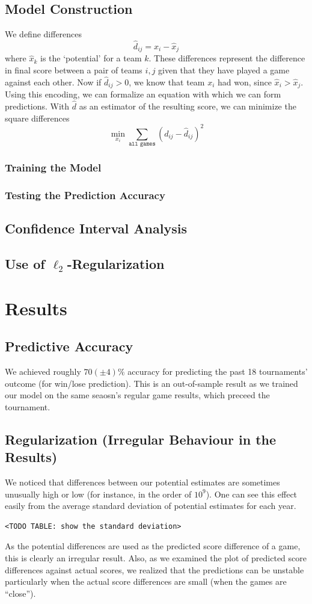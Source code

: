 \documentclass{article} %
\begin{document}
\subsection{Model Construction}
We define differences 
\[
\hat{d}_{ij} = \hat{x}_i - \hat{x}_j
\]
where $\hat{x}_k$ is the `potential' for a team $k$. These differences represent the difference in final score between a pair of teams $i,j$ given that they have played a game against each other. Now if $\hat{d}_{ij} > 0$, we know that team $x_i$ had won, since $\hat{x}_i > \hat{x}_j$. Using this encoding, we can formalize an equation with which we can form predictions. With $\hat{d}$ as an estimator of the resulting score, we can minimize the square differences 
\[
\min_{x_i}\sum_{\texttt{all games}}\left(d_{ij}-\hat{d}_{ij} \right)^2
\]
\subsubsection{Training the Model}
\subsubsection{Testing the Prediction Accuracy}
\subsection{Confidence Interval Analysis}
\subsection{Use of $\ell_2$-Regularization}\label{sec:l2}

\section{Results}
\subsection{Predictive Accuracy}
We achieved roughly $70(\pm4)\%$ accuracy for predicting the past 18 tournaments' outcome (for win/lose prediction).  This is an out-of-sample result as we trained our model on the same seaosn's regular game results, which preceed the tournament.
\subsection{Regularization (Irregular Behaviour in the Results)}
We noticed that differences between our potential estimates are sometimes unusually high or low (for instance, in the order of $10^9$).  One can see this effect easily from the average standard deviation of potential estimates for each year.
\begin{verbatim}
<TODO TABLE: show the standard deviation>	
\end{verbatim} As the potential differences are used as the predicted score difference of a game, this is clearly an irregular result.  Also, as we examined the plot of predicted score differences against actual scores, we realized that the predictions can be unstable particularly when the actual score differences are small (when the games are ``close''). 
\end{document}
